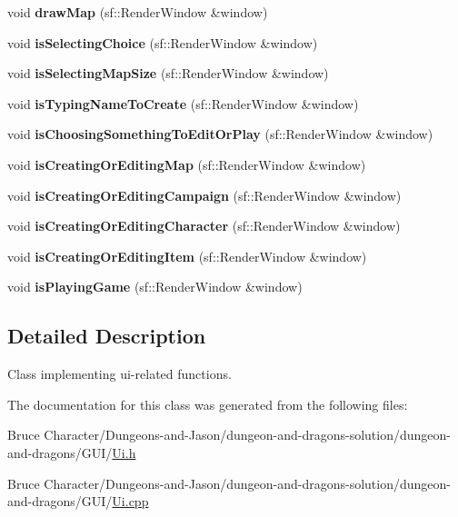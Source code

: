 \begin{DoxyCompactItemize}
\item 
\hypertarget{class_ui_a9a84399726e4a77841e792b5fd00c23f}{}\label{class_ui_a9a84399726e4a77841e792b5fd00c23f} 
void {\bfseries draw\+Map} (sf\+::\+Render\+Window \&window)
\item 
\hypertarget{class_ui_a393a4afb8474a0590c3de2dcb5ae2db4}{}\label{class_ui_a393a4afb8474a0590c3de2dcb5ae2db4} 
void {\bfseries is\+Selecting\+Choice} (sf\+::\+Render\+Window \&window)
\item 
\hypertarget{class_ui_a77c8f892d8089801b5c4fbd0445a805d}{}\label{class_ui_a77c8f892d8089801b5c4fbd0445a805d} 
void {\bfseries is\+Selecting\+Map\+Size} (sf\+::\+Render\+Window \&window)
\item 
\hypertarget{class_ui_a7f580e40fdfe210d064020417e111f8e}{}\label{class_ui_a7f580e40fdfe210d064020417e111f8e} 
void {\bfseries is\+Typing\+Name\+To\+Create} (sf\+::\+Render\+Window \&window)
\item 
\hypertarget{class_ui_af2c9f2c2cfdc301305ddb05a05504ea8}{}\label{class_ui_af2c9f2c2cfdc301305ddb05a05504ea8} 
void {\bfseries is\+Choosing\+Something\+To\+Edit\+Or\+Play} (sf\+::\+Render\+Window \&window)
\item 
\hypertarget{class_ui_a1ddb86a3f582232355e18295e8e95b32}{}\label{class_ui_a1ddb86a3f582232355e18295e8e95b32} 
void {\bfseries is\+Creating\+Or\+Editing\+Map} (sf\+::\+Render\+Window \&window)
\item 
\hypertarget{class_ui_ab7e9eff8440b772478dc4389d11b59b6}{}\label{class_ui_ab7e9eff8440b772478dc4389d11b59b6} 
void {\bfseries is\+Creating\+Or\+Editing\+Campaign} (sf\+::\+Render\+Window \&window)
\item 
\hypertarget{class_ui_a155f4ec4096caff878adedd223d6056f}{}\label{class_ui_a155f4ec4096caff878adedd223d6056f} 
void {\bfseries is\+Creating\+Or\+Editing\+Character} (sf\+::\+Render\+Window \&window)
\item 
\hypertarget{class_ui_ad62a85e4727b72b3b891f61e615d99c4}{}\label{class_ui_ad62a85e4727b72b3b891f61e615d99c4} 
void {\bfseries is\+Creating\+Or\+Editing\+Item} (sf\+::\+Render\+Window \&window)
\item 
\hypertarget{class_ui_a696abb454d03c7ee86f4ff99d4974b25}{}\label{class_ui_a696abb454d03c7ee86f4ff99d4974b25} 
void {\bfseries is\+Playing\+Game} (sf\+::\+Render\+Window \&window)
\end{DoxyCompactItemize}


\subsection{Detailed Description}
Class implementing ui-\/related functions. 

The documentation for this class was generated from the following files\+:\begin{DoxyCompactItemize}
\item 
Bruce Character/\+Dungeons-\/and-\/\+Jason/dungeon-\/and-\/dragons-\/solution/dungeon-\/and-\/dragons/\+G\+U\+I/\hyperlink{_ui_8h}{Ui.\+h}\item 
Bruce Character/\+Dungeons-\/and-\/\+Jason/dungeon-\/and-\/dragons-\/solution/dungeon-\/and-\/dragons/\+G\+U\+I/\hyperlink{_ui_8cpp}{Ui.\+cpp}\end{DoxyCompactItemize}
